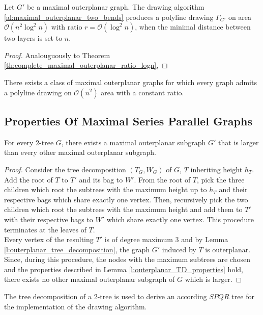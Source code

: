 \begin{theorem}
	Let $G'$ be a maximal outerplanar graph. The drawing algorithm \ref{al:maximal_outerplanar_two_bends} produces a polyline drawing $\Gamma_{G'}$ on area $\mathcal{O}(n^2 \log^2 n)$ with ratio $r = \mathcal{O}(\log^2 n)$, when the minimal distance between two layers is set to $n$.
\end{theorem}
\begin{proof}
	Analouguously to Theorem \ref{th:complete_maximal_outerplanar_ratio_logn}, 
\end{proof}

\begin{theorem}
	There exists a class of maximal outerplanar graphs for which every graph admits a polyline drawing on $\mathcal{O}(n^2)$ area with a constant ratio.
\end{theorem}


\subsection{Properties Of Maximal Series Parallel Graphs}


\begin{lemma}
	For every 2-tree $G$, there exists a maximal outerplanar subgraph $G'$ that is larger than every other maximal outerplanar subgraph.
\end{lemma}
\begin{proof}
	Consider the tree decomposition $(T_G,W_G)$ of $G$, $T$ inheriting height $h_T$. Add the root of $T$ to $T'$ and its bag to $W'$. From the root of $T$, pick the three children which root the subtrees with the maximum height up to $h_T$ and their respective bags which share exactly one vertex. Then, recursively pick the two children which root the subtrees with the maximum height and add them to $T'$ with their respective bags to $W'$ which share exactly one vertex. This procedure terminates at the leaves of $T$.\\
	Every vertex of the resulting $T'$ is of degree maximum 3 and by Lemma \ref{l:outerplanar_tree_decomposition}, the graph $G'$ induced by $T$ is outerplanar. Since, during this procedure, the nodes with the maximum subtrees are chosen and the properties described in Lemma \ref{l:outerplanar_TD_properties} hold, there exists no other maximal outerplanar subgraph of $G$ which is larger. 
\end{proof}

The tree decomposition of a 2-tree is used to derive an according $SPQR$ tree for the implementation of the drawing algorithm.

